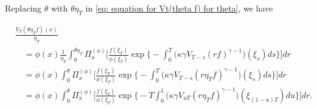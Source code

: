 \documentclass[12pt,a4paper]{amsart}
\theoremstyle{definition}
\numberwithin{equation}{section}
\begin{document}
Replacing $\theta$ with $\theta \eta_T$ in \eqref{eq: equation for Vt(theta f) for theta}, we have

\begin{align}\label{eq: equation for normalized V_T}
	&\frac{V_T(\theta \eta_T f)(x)}{\eta_T}
	\\&\quad= \phi(x) \frac{1}{\eta_T}\int_0^{\theta \eta_T} \Pi_x^{(\phi)} \Big[ \frac { f(\xi_T) } { \phi(\xi_T) } \exp\Big\{-\int_0^T \big(\kappa\gamma V_{T-s}(r f)^{\gamma-1}\big)(\xi_s) ds\Big\}\Big] dr
	\\&\quad = \phi(x) \int_0^{\theta} \Pi_x^{(\phi)} \Big[ \frac { f(\xi_T) } { \phi(\xi_T) }  \exp\Big\{-\int_0^T \big(\kappa\gamma V_{T-s}(r \eta_T f)^{\gamma-1}\big)(\xi_s) ds\Big\}\Big] dr
	\\&\quad = \phi(x)\int_0^{\theta} \Pi_x^{(\phi)} \Big[\frac{f(\xi_T)}{\phi(\xi_T)} \exp\Big\{-T\int_0^1 \big(\kappa\gamma V_{uT}(r \eta_T f)^{\gamma-1}\big)(\xi_{(1-u)T}) du\Big\}\Big] dr.
\end{align}
\end{document}
